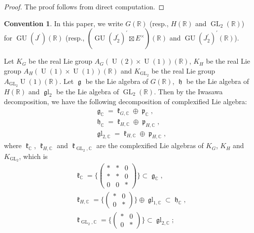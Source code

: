 \documentclass[11pt, a4paper]{amsart}
\theoremstyle{plain}
\theoremstyle{definition}
\newtheorem{convention}[theorem]{Convention}
\numberwithin{equation}{section}
\def\CC{\mathbb{C}}
\def\RR{\mathbb{R}}
\DeclareMathOperator{\GU}{GU}
\DeclareMathOperator{\GL}{\mathrm{GL}}
\DeclareMathOperator{\U}{\mathrm{U}}
\DeclareMathOperator{\lieg}{\mathfrak g}
\DeclareMathOperator{\liek}{\mathfrak k}
\DeclareMathOperator{\lieh}{\mathfrak h}
\DeclareMathOperator{\liep}{\mathfrak p}
\DeclareMathOperator{\liegl}{\mathfrak gl}
\begin{document}
\begin{proof}
    The proof follows from direct computation. 
\end{proof}

\begin{convention}
    In this paper, we write $G(\RR)$ (resp., $H(\RR)$ and $\GL_{2}(\RR)$) for $\GU(J^{\prime})(\RR)$ (resp., 
    $(\GU(J_{2}^{\prime})^{\prime} \boxtimes E^{\times})(\RR)$ and $\GU(J_{2}^{\prime})^{\prime}(\RR)$). 
\end{convention}

Let $K_{G}$ be the real Lie group $A_{G}(\U(2) \times \U(1))(\RR)$,  $K_{H}$ be the real Lie group $A_{H}(\U(1) \times \U(1))(\RR)$ and $K_{\GL_2}$ be the real Lie group $A_{\GL_{2}}\U(1)(\RR)$. Let $\lieg$ be the Lie algebra of $G(\RR)$, $\lieh$ be the Lie algebra of $H(\RR)$ and $\liegl_{2}$ be the Lie algebra of $\GL_2(\RR)$. Then by the 
Iwasawa decomposition, we have the following decomposition of complexified Lie algebra: 
\begin{align*}
    & \lieg_{\CC} = \liek_{G, \CC} \oplus \liep_{\CC}, \\
    & \lieh_{\CC} = \liek_{H, \CC} \oplus \liep_{H, \CC}, \\
    & \liegl_{2, \CC} = \liek_{H, \CC} \oplus \liep_{H, \CC}, 
\end{align*}
where $\liek_{\CC}$, $\liek_{H, \CC}$ and $\liek_{\GL_2, \CC}$ are the complexified Lie algebras of $K_{G}$, $K_{H}$ and $K_{\GL_{2}}$, which is
\begin{align*}
    & \liek_{\CC} = \{\begin{pmatrix}
                        * & * & 0 \\
                        * & * & 0 \\
                        0 & 0 & * 
                      \end{pmatrix}\} \subset \lieg_{\CC}, \\ 
    & \liek_{H, \CC} = \{\begin{pmatrix}
                            * & 0 \\
                            0 & * 
                        \end{pmatrix}\} \oplus \liegl_{1, \CC} \subset \lieh_{\CC}, \\
    & \liek_{\GL_{2}, \CC} = \{\begin{pmatrix}
                            * & 0 \\
                            0 & * 
                        \end{pmatrix}\} \subset \liegl_{2, \CC}; 
\end{align*}
\end{document}
